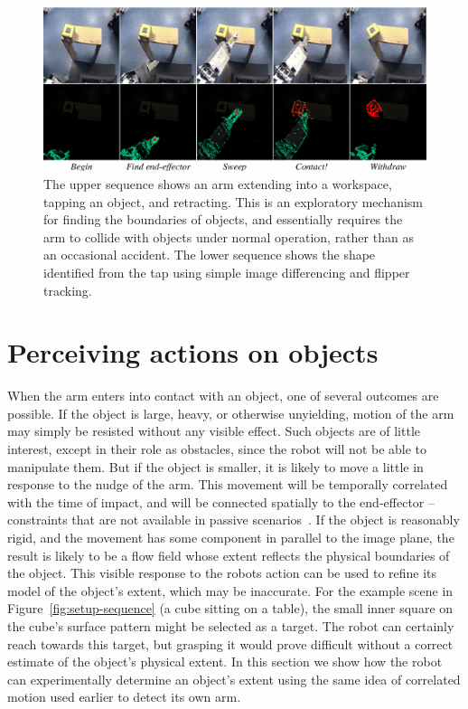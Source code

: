 \begin{figure}[tb]
\begin{center}
\includegraphics[width=\columnwidth]{poking-sequence.eps}

\caption{ 
\label{fig:poking-sequence}
%
  The upper sequence shows an arm extending into a workspace, tapping
  an object, and retracting.  This is an exploratory mechanism for
  finding the boundaries of objects, and essentially requires the arm
  to collide with objects under normal operation, rather than as an
  occasional accident.  The lower sequence shows the shape
  identified from the tap using simple image differencing and flipper
  tracking.
%
}
\end{center}
\end{figure}



\section{Perceiving actions on objects}

When the arm enters into contact with an object, one of several
outcomes are possible.  If the object is large, heavy, or otherwise
unyielding, motion of the arm may simply be resisted without any
visible effect.  Such objects are of little interest, except in their
role as obstacles, since the robot will not be able to manipulate
them.  But if the object is smaller, it is likely to move a little in
response to the nudge of the arm.  This movement will be temporally
correlated with the time of impact, and will be connected spatially to
the end-effector -- constraints that are not available in passive
scenarios~\cite{birchfield99depth}.  If the object is reasonably
rigid, and the movement has some component in parallel to the image
plane, the result is likely to be a flow field whose extent reflects
the physical boundaries of the object.  This visible response to
the robots action can be used to refine its model of the object's
extent, which may be inaccurate.  For the example scene in
Figure~\ref{fig:setup-sequence} (a cube sitting on a table), the small
inner square on the cube's surface pattern might be selected as a
target.  The robot can certainly reach towards this target, but
grasping it would prove difficult without a correct estimate of the
object's physical extent.  In this section we show how the robot can
experimentally determine an object's extent using the same idea of
correlated motion used earlier to detect its own arm.


